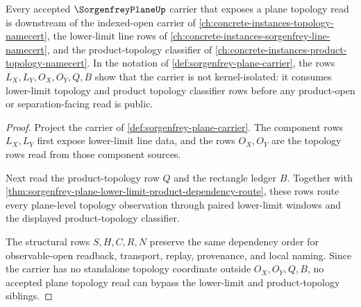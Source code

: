 \begin{theorem}
\label{thm:sorgenfrey-plane-topology-sibling-route}
Every accepted $\SorgenfreyPlaneUp$ carrier that exposes a plane topology read is downstream of the indexed-open carrier of \autoref{ch:concrete-instances-topology-namecert}, the lower-limit line rows of \autoref{ch:concrete-instances-sorgenfrey-line-namecert}, and the product-topology classifier of \autoref{ch:concrete-instances-product-topology-namecert}. In the notation of \autoref{def:sorgenfrey-plane-carrier}, the rows $L_X,L_Y,O_X,O_Y,Q,B$ show that the carrier is not kernel-isolated: it consumes lower-limit topology and product topology classifier rows before any product-open or separation-facing read is public.
\end{theorem}
\begin{proof}
Project the carrier of \autoref{def:sorgenfrey-plane-carrier}. The component rows $L_X,L_Y$ first expose lower-limit line data, and the rows $O_X,O_Y$ are the topology rows read from those component sources.

Next read the product-topology row $Q$ and the rectangle ledger $B$. Together with \autoref{thm:sorgenfrey-plane-lower-limit-product-dependency-route}, these rows route every plane-level topology observation through paired lower-limit windows and the displayed product-topology classifier.

The structural rows $S,H,C,R,N$ preserve the same dependency order for observable-open readback, transport, replay, provenance, and local naming. Since the carrier has no standalone topology coordinate outside $O_X,O_Y,Q,B$, no accepted plane topology read can bypass the lower-limit and product-topology siblings.
\end{proof}

